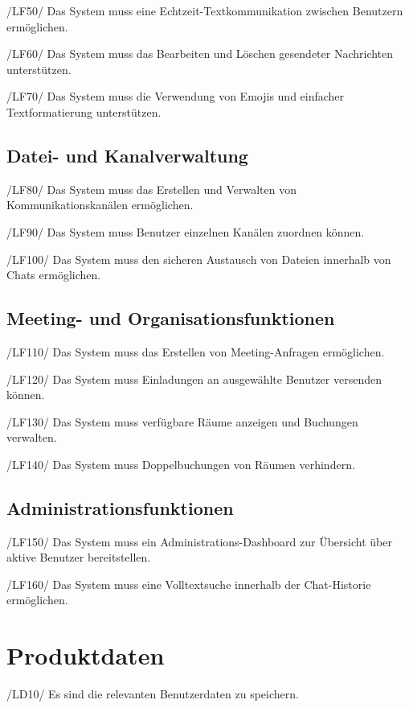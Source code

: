 \documentclass[12pt,a4paper]{extarticle}
\begin{document}
/LF50/ Das System muss eine Echtzeit-Textkommunikation zwischen Benutzern ermöglichen.  

/LF60/ Das System muss das Bearbeiten und Löschen gesendeter Nachrichten unterstützen.  

/LF70/ Das System muss die Verwendung von Emojis und einfacher Textformatierung unterstützen.  

\subsection*{Datei- und Kanalverwaltung}

/LF80/ Das System muss das Erstellen und Verwalten von Kommunikationskanälen ermöglichen.  

/LF90/ Das System muss Benutzer einzelnen Kanälen zuordnen können.  

/LF100/ Das System muss den sicheren Austausch von Dateien innerhalb von Chats ermöglichen.  

\newpage
\subsection*{Meeting- und Organisationsfunktionen}

/LF110/ Das System muss das Erstellen von Meeting-Anfragen ermöglichen.  

/LF120/ Das System muss Einladungen an ausgewählte Benutzer versenden können.  

/LF130/ Das System muss verfügbare Räume anzeigen und Buchungen verwalten.  

/LF140/ Das System muss Doppelbuchungen von Räumen verhindern.  

\subsection*{Administrationsfunktionen}

/LF150/ Das System muss ein Administrations-Dashboard zur Übersicht über aktive Benutzer bereitstellen.  
 
/LF160/ Das System muss eine Volltextsuche innerhalb der Chat-Historie ermöglichen.  
 


\section{Produktdaten}

/LD10/ Es sind die relevanten Benutzerdaten zu speichern.  
\end{document}
